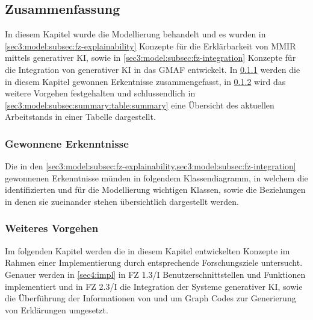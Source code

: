 \clearpage

\subsection{Zusammenfassung}
\label{sec3:model:subsec:summary}
In diesem Kapitel wurde die Modellierung behandelt und es wurden in \cref{sec3:model:subsec:fz-explainability} Konzepte für die Erklärbarkeit von MMIR mittels generativer KI, sowie in \cref{sec3:model:subsec:fz-integration} Konzepte für die Integration von generativer KI in das GMAF entwickelt.
In \cref{sec3:model:subsubsec:summary-findings} werden die in diesem Kapitel gewonnen Erkentnisse zusammengefasst, in \cref{sec3:model:subsubsec:futher-approach} wird das weitere Vorgehen festgehalten und schlussendlich in \cref{sec3:model:subsec:summary:table:summary} eine Übersicht des aktuellen Arbeitstands in einer Tabelle dargestellt.

\subsubsection{Gewonnene Erkenntnisse}
\label{sec3:model:subsubsec:summary-findings}



Die in den \cref{sec3:model:subsec:fz-explainability,sec3:model:subsec:fz-integration} gewonnenen Erkenntnisse münden in folgendem Klassendiagramm, in welchem die identifizierten und für die Modellierung wichtigen Klassen, sowie die Beziehungen in denen sie zueinander stehen übersichtlich dargestellt werden.


\subsubsection{Weiteres Vorgehen}
\label{sec3:model:subsubsec:futher-approach}
Im folgenden Kapitel werden die in diesem Kapitel entwickelten Konzepte im Rahmen einer Implementierung durch entsprechende Forschungsziele untersucht.
Genauer werden in \cref{sec4:impl} in FZ 1.3/I Benutzerschnittstellen und Funktionen implementiert und in FZ 2.3/I die Integration der Systeme generativer KI, sowie die Überführung der Informationen von und um Graph Codes zur Generierung von Erklärungen umgesetzt.


